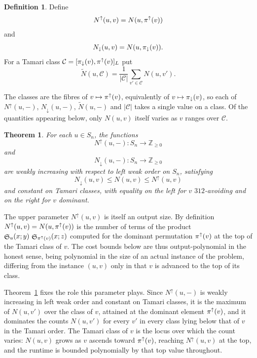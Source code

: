 \documentclass{amsart}
\newtheorem{theorem}[lemma]{Theorem}
\theoremstyle{definition}
\newtheorem{definition}[lemma]{Definition}
\theoremstyle{remark}
\numberwithin{equation}{section}
\DeclareMathOperator{\sch}{\mathfrak{S}}
\begin{document}
\begin{definition}
Define
$$N^\uparrow(u,v) = N(u,\pi^\uparrow(v))$$
and
$$N_\downarrow(u,v) = N(u,\pi_{\downarrow}(v)).$$
For a Tamari class $\mathcal{C}=[\pi_{\downarrow}(v),\pi^\uparrow(v)]_L$ put
$$\widetilde{N}(u,\mathcal{C}) = \frac{1}{|\mathcal{C}|}\sum_{v'\in\mathcal{C}}N(u,v').$$
\end{definition}

The classes are the fibres of $v\mapsto\pi^\uparrow(v)$, equivalently of $v\mapsto\pi_{\downarrow}(v)$, so each of $N^\uparrow(u,-)$, $N_\downarrow(u,-)$, $\widetilde{N}(u,-)$ and $|\mathcal{C}|$ takes a single value on a class. Of the quantities appearing below, only $N(u,v)$ itself varies as $v$ ranges over $\mathcal{C}$.

\begin{theorem} \label{thm:Nupdown}
For each $u\in S_n$, the functions
$$N^\uparrow(u,-):S_n\to\mathbb{Z}_{\geq 0}$$
and
$$N_\downarrow(u,-):S_n\to\mathbb{Z}_{\geq 0}$$
are weakly increasing with respect to left weak order on $S_n$, satisfying 
$$N_\downarrow(u,v)\leq N(u,v)\leq N^\uparrow(u,v)$$
and constant on Tamari classes, with equality on the left for $v$ $312$-avoiding and on the right for $v$ dominant.
\end{theorem}

The upper parameter $N^\uparrow(u,v)$ is itself an output size. By definition $N^\uparrow(u,v)=N(u,\pi^\uparrow(v))$ is the number of terms of the product $\sch_u(x;y)\,\sch_{\mdom{v}}(x;z)$ computed for the dominant permutation $\pi^\uparrow(v)$ at the top of the Tamari class of $v$. The cost bounds below are thus output-polynomial in the honest sense, being polynomial in the size of an actual instance of the problem, differing from the instance $(u,v)$ only in that $v$ is advanced to the top of its class.

Theorem~\ref{thm:Nupdown} fixes the role this parameter plays. Since $N^\uparrow(u,-)$ is weakly increasing in left weak order and constant on Tamari classes, it is the maximum of $N(u,v')$ over the class of $v$, attained at the dominant element $\pi^\uparrow(v)$, and it dominates the counts $N(u,v')$ for every $v'$ in every class lying below that of $v$ in the Tamari order. The Tamari class of $v$ is the locus over which the count varies: $N(u,v)$ grows as $v$ ascends toward $\pi^\uparrow(v)$, reaching $N^\uparrow(u,v)$ at the top, and the runtime is bounded polynomially by that top value throughout.
\end{document}
